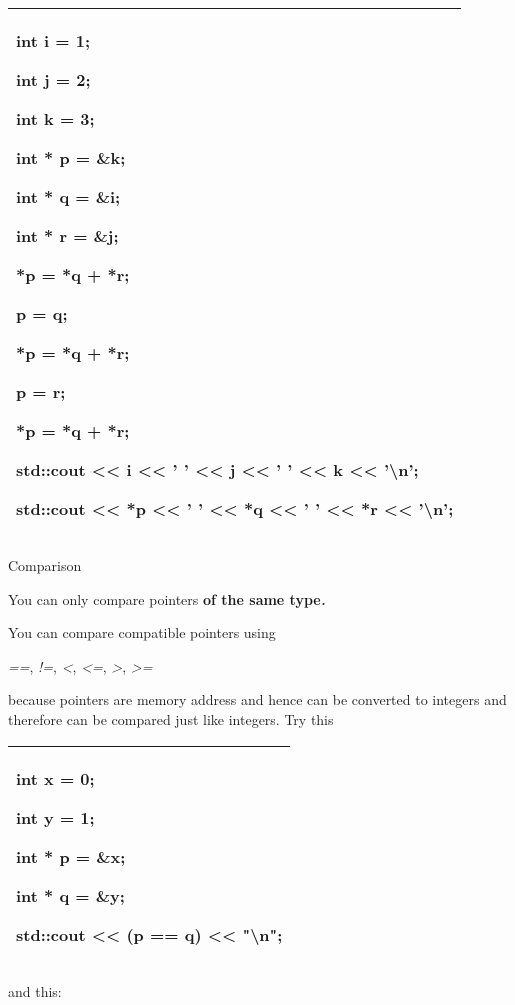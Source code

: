 \documentclass[
]{article}
\begin{document}
\begin{longtable}[]{@{}l@{}}
\toprule
\endhead
\begin{minipage}[t]{0.97\columnwidth}\raggedright
int i = 1;

int j = 2;

int k = 3;

int * p = \&k;

int * q = \&i;

int * r = \&j;

*p = *q + *r;

p = q;

*p = *q + *r;

p = r;

*p = *q + *r;

std::cout \textless\textless{} i \textless\textless{} ' '
\textless\textless{} j \textless\textless{} ' ' \textless\textless{} k
\textless\textless{} '\textbackslash n';

std::cout \textless\textless{} *p \textless\textless{} ' '
\textless\textless{} *q \textless\textless{} ' ' \textless\textless{} *r
\textless\textless{} '\textbackslash n'; \strut
\end{minipage}\tabularnewline
\bottomrule
\end{longtable}

Comparison

You can only compare pointers \textbf{of the same type}\emph{\textbf{.}}

You can compare compatible pointers using

\emph{==}, \emph{!=}, \emph{\textless{}}, \emph{\textless=},
\emph{\textgreater{}}, \emph{\textgreater=}

because pointers are memory address and hence can be converted to
integers and therefore can be compared just like integers. Try this

\begin{longtable}[]{@{}l@{}}
\toprule
\endhead
\begin{minipage}[t]{0.97\columnwidth}\raggedright
int x = 0;

int y = 1;

int * p = \&x;

int * q = \&y;

std::cout \textless\textless{} (p == q) \textless\textless{}
"\textbackslash n";\strut
\end{minipage}\tabularnewline
\bottomrule
\end{longtable}

and this:
\end{document}
